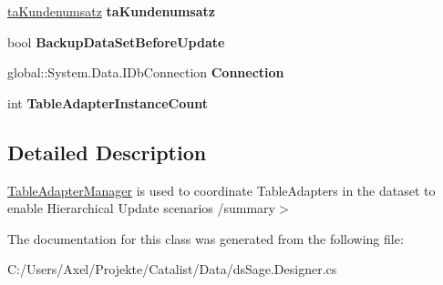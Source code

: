 \begin{DoxyCompactItemize}
\item 
\hyperlink{class_products_1_1_data_1_1ds_sage_table_adapters_1_1ta_kundenumsatz}{ta\+Kundenumsatz} {\bfseries ta\+Kundenumsatz}\hypertarget{class_products_1_1_data_1_1ds_sage_table_adapters_1_1_table_adapter_manager_a6ea52a20bf532c7fdf3ceae5ae47116e}{}\label{class_products_1_1_data_1_1ds_sage_table_adapters_1_1_table_adapter_manager_a6ea52a20bf532c7fdf3ceae5ae47116e}

\item 
bool {\bfseries Backup\+Data\+Set\+Before\+Update}\hypertarget{class_products_1_1_data_1_1ds_sage_table_adapters_1_1_table_adapter_manager_ab7f253fd21515a397549fd089c168724}{}\label{class_products_1_1_data_1_1ds_sage_table_adapters_1_1_table_adapter_manager_ab7f253fd21515a397549fd089c168724}

\item 
global\+::\+System.\+Data.\+I\+Db\+Connection {\bfseries Connection}\hypertarget{class_products_1_1_data_1_1ds_sage_table_adapters_1_1_table_adapter_manager_ad0f98c99d85fbbb3c04dbb582476a016}{}\label{class_products_1_1_data_1_1ds_sage_table_adapters_1_1_table_adapter_manager_ad0f98c99d85fbbb3c04dbb582476a016}

\item 
int {\bfseries Table\+Adapter\+Instance\+Count}\hypertarget{class_products_1_1_data_1_1ds_sage_table_adapters_1_1_table_adapter_manager_abe175d49f64a62349a19a4c11f452077}{}\label{class_products_1_1_data_1_1ds_sage_table_adapters_1_1_table_adapter_manager_abe175d49f64a62349a19a4c11f452077}

\end{DoxyCompactItemize}


\subsection{Detailed Description}
\hyperlink{class_products_1_1_data_1_1ds_sage_table_adapters_1_1_table_adapter_manager}{Table\+Adapter\+Manager} is used to coordinate Table\+Adapters in the dataset to enable Hierarchical Update scenarios /summary$>$ 

The documentation for this class was generated from the following file\+:\begin{DoxyCompactItemize}
\item 
C\+:/\+Users/\+Axel/\+Projekte/\+Catalist/\+Data/ds\+Sage.\+Designer.\+cs\end{DoxyCompactItemize}
